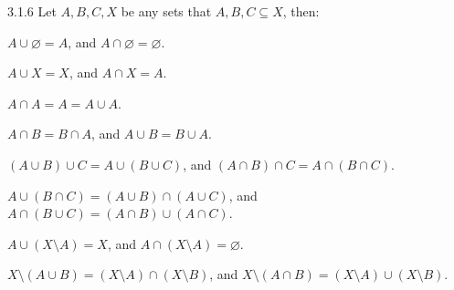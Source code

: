 \begin{exercise}{3.1.6}
	Let $A,B,C,X$ be any sets that $A,B,C \subseteq X$, then:
	\begin{enumabc}
		\item $A \cup \varnothing = A$, and $A \cap \varnothing = \varnothing$.
		\item $A \cup X = X$, and $A \cap X = A$.
		\item $A \cap A = A = A \cup A$.
		\item $A \cap B = B \cap A$, and $A \cup B = B \cup A$.
		\item $(A \cup B) \cup C = A \cup (B \cup C)$, and $(A \cap B) \cap C = A \cap (B \cap C)$.
		\item $A \cup (B \cap C) = (A \cup B) \cap (A \cup C)$, and $A \cap (B \cup C) = (A \cap B) \cup (A \cap C)$.
		\item $A \cup (X \setminus A) = X$, and $A \cap (X \setminus A) = \varnothing$. 
		\item $X \setminus (A \cup B) = (X \setminus A) \cap (X \setminus B)$, and $X \setminus (A \cap B) = (X \setminus A) \cup (X \setminus B)$.
	\end{enumabc}
\end{exercise}
